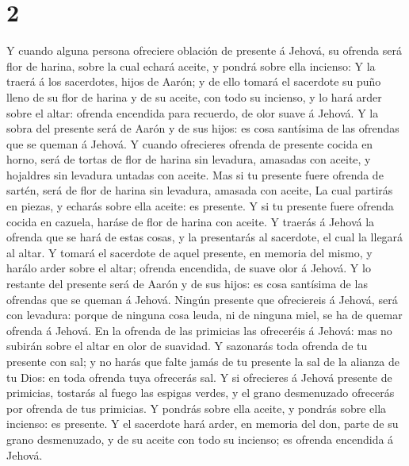 \hypertarget{section-1}{%
\section{2}\label{section-1}}

 Y cuando alguna persona ofreciere oblación de presente á
Jehová, su ofrenda será flor de harina, sobre la cual echará aceite, y
pondrá sobre ella incienso:  Y la traerá á los sacerdotes,
hijos de Aarón; y de ello tomará el sacerdote su puño lleno de su flor
de harina y de su aceite, con todo su incienso, y lo hará arder sobre el
altar: ofrenda encendida para recuerdo, de olor suave á Jehová.
 Y la sobra del presente será de Aarón y de sus hijos: es
cosa santísima de las ofrendas que se queman á Jehová.  Y
cuando ofrecieres ofrenda de presente cocida en horno, será de tortas de
flor de harina sin levadura, amasadas con aceite, y hojaldres sin
levadura untadas con aceite.  Mas si tu presente fuere
ofrenda de sartén, será de flor de harina sin levadura, amasada con
aceite,  La cual partirás en piezas, y echarás sobre ella
aceite: es presente.  Y si tu presente fuere ofrenda
cocida en cazuela, haráse de flor de harina con aceite.  Y
traerás á Jehová la ofrenda que se hará de estas cosas, y la presentarás
al sacerdote, el cual la llegará al altar.  Y tomará el
sacerdote de aquel presente, en memoria del mismo, y harálo arder sobre
el altar; ofrenda encendida, de suave olor á Jehová.  Y
lo restante del presente será de Aarón y de sus hijos: es cosa santísima
de las ofrendas que se queman á Jehová.  Ningún presente
que ofreciereis á Jehová, será con levadura: porque de ninguna cosa
leuda, ni de ninguna miel, se ha de quemar ofrenda á Jehová.
 En la ofrenda de las primicias las ofreceréis á Jehová:
mas no subirán sobre el altar en olor de suavidad.  Y
sazonarás toda ofrenda de tu presente con sal; y no harás que falte
jamás de tu presente la sal de la alianza de tu Dios: en toda ofrenda
tuya ofrecerás sal.  Y si ofrecieres á Jehová presente de
primicias, tostarás al fuego las espigas verdes, y el grano desmenuzado
ofrecerás por ofrenda de tus primicias.  Y pondrás sobre
ella aceite, y pondrás sobre ella incienso: es presente. 
Y el sacerdote hará arder, en memoria del don, parte de su grano
desmenuzado, y de su aceite con todo su incienso; es ofrenda encendida á
Jehová.

